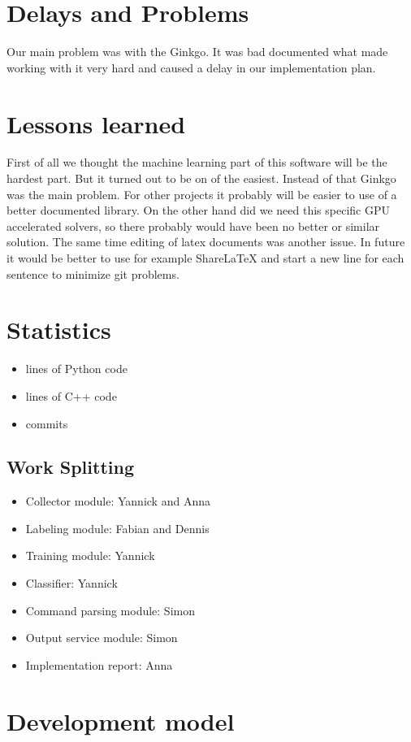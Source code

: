 \documentclass[parskip=full]{scrartcl}
\begin{document}
\section{Delays and Problems}
Our main problem was with the \gls{Ginkgo}. 
It was bad documented what made working with it very hard and caused a delay in our implementation plan. 


\section{Lessons learned}
First of all we thought the machine learning part of this software will be the hardest part.
But it turned out to be on of the easiest.
Instead of that \gls{Ginkgo} was the main problem.
For other projects it probably will be easier to use of a better documented library.
On the other hand did we need this specific GPU accelerated solvers, so there probably would have been no better or similar solution.
The same time editing of latex documents was another issue.
In future it would be better to use for example ShareLaTeX and start a new line for each sentence to minimize git problems.

\section{Statistics}
\begin{itemize}
\item lines of Python code
\item lines of C++ code
\item commits
\end{itemize}
\subsection{Work Splitting}
\begin{itemize}
\item Collector module: Yannick and Anna
\item Labeling module: Fabian and Dennis
\item Training module: Yannick
\item Classifier: Yannick
\item Command parsing module: Simon
\item Output service module: Simon
\item Implementation report: Anna
\end{itemize}

\section{Development model}
\end{document}

